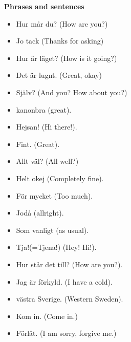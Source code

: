 
\begin{flushleft}
    \textbf{Phrases and sentences}
    \begin{itemize}
        \item Hur mår du? (How are you?)
        \item Jo tack (Thanks for asking)
        \item Hur är läget? (How is it going?)
        \item Det är lugnt. (Great, okay)
        \item Själv? (And you? How about you?)
        \item kanonbra (great).
        \item Hejsan! (Hi there!).
        \item Fint. (Great).
        \item Allt väl? (All well?)
        \item Helt okej (Completely fine).
        \item För mycket (Too much).
        \item Jodå (allright).
        \item Som vanligt (as usual).
        \item Tja!(=Tjena!) (Hey! Hi!).
        \item Hur står det till? (How are you?).
        \item Jag är förkyld. (I have a cold).
        \item västra Sverige. (Western Sweden).
        \item Kom in. (Come in.)
        \item Förlåt. (I am sorry, forgive me.)
    \end{itemize}
\end{flushleft}

